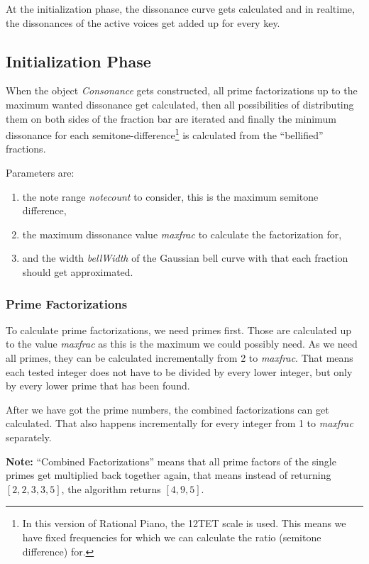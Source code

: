 \documentclass[12pt,a4paper,titlepage,oneside]{report}
\begin{document}
At the initialization phase, the dissonance curve gets calculated and in realtime, the dissonances of the active voices get added up for every key.


\subsection{Initialization Phase}

When the object \emph{Consonance} gets constructed, all prime factorizations up to the maximum wanted dissonance get calculated, then all possibilities of distributing them on both sides of the fraction bar are iterated and finally the minimum dissonance for each semitone-difference\footnote{In this version of Rational Piano, the 12TET scale is used. This means we have fixed frequencies for which we can calculate the ratio (semitone difference) for.} is calculated from the ``bellified'' fractions.

Parameters are:
\begin{enumerate}
	\item the note range \emph{notecount} to consider, this is the maximum semitone difference,
	\item the maximum dissonance value \emph{maxfrac} to calculate the factorization for,
	\item and the width \emph{bellWidth} of the Gaussian bell curve with that each fraction should get approximated.
\end{enumerate}


\subsubsection{Prime Factorizations}

To calculate prime factorizations, we need primes first. Those are calculated up to the value \emph{maxfrac} as this is the maximum we could possibly need. As we need all primes, they can be calculated incrementally from 2 to \emph{maxfrac}. That means each tested integer does not have to be divided by every lower integer, but only by every lower prime that has been found.

After we have got the prime numbers, the combined factorizations can get calculated. That also happens incrementally for every integer from 1 to \emph{maxfrac} separately.

\textbf{Note:} ``Combined Factorizations'' means that all prime factors of the single primes get multiplied back together again, that means instead of returning $[2,2,3,3,5]$, the algorithm returns $[4,9,5]$.
\end{document}

